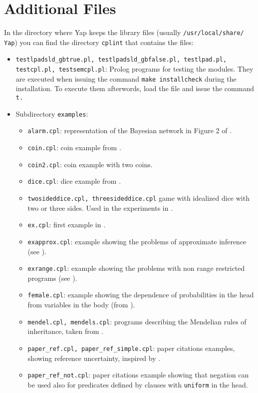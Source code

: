 \documentclass[a4paper,12pt]{article}
\begin{document}
\section{Additional Files}
In the directory where Yap keeps the library files (usually \texttt{/usr/local/share/ Yap}) you can find the directory \texttt{cplint} that contains the files:
\begin{itemize}
\item \verb|testlpadsld_gbtrue.pl, testlpadsld_gbfalse.pl, testlpad.pl,| \verb|testcpl.pl, testsemcpl.pl|: Prolog programs for testing the modules. They are executed when issuing the command \texttt{make installcheck} during the installation. To execute them afterwords, load the file and issue the command \texttt{t.} 
\item Subdirectory \texttt{examples}:
\begin{itemize}
\item \texttt{alarm.cpl}: representation of the Bayesian network in Figure 2 of
 \cite{VenVer04-ICLP04-IC}.
\item \texttt{coin.cpl}: coin example from   \cite{VenVer04-ICLP04-IC}.
\item \texttt{coin2.cpl}: coin example with two coins.
\item \texttt{dice.cpl}: dice example from \cite{VenVer04-ICLP04-IC}.
\item \verb|twosideddice.cpl, threesideddice.cpl|  game with idealized dice with two or three  sides. Used in the experiments in \cite{Rig-RCRA07-IC}.
\item \texttt{ex.cpl}: first example in \cite{Rig-RCRA07-IC}.
\item \texttt{exapprox.cpl}: example showing the problems of approximate inference (see \cite{Rig-RCRA07-IC}).
\item \texttt{exrange.cpl}: example showing the problems with non range restricted programs (see \cite{Rig-RCRA07-IC}).
\item \texttt{female.cpl}: example showing the dependence of probabilities in the head from variables in the body (from \cite{VenVer04-ICLP04-IC}).
\item \texttt{mendel.cpl, mendels.cpl}: programs describing the Mendelian rules of inheritance, taken from \cite{Blo04-ILP04WIP-IC}.
\item \verb|paper_ref.cpl, paper_ref_simple.cpl|: paper citations examples, showing reference uncertainty, inspired by \cite{Getoor+al:JMLR02}.
\item \verb|paper_ref_not.cpl|: paper citations example showing that negation can be used also for predicates defined by clauses with \texttt{uniform} in the head.

\end{itemize}
\end{itemize}
\end{document}
